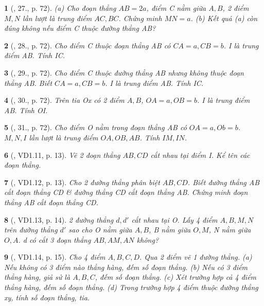 \documentclass{article}
\newtheorem{baitoan}{}
\begin{document}
\begin{baitoan}[\cite{Binh_Toan_6_tap_2}, 27., p. 72]
	(a) Cho đoạn thẳng $AB = 2a$, điểm C nằm giữa $A,B$, 2 điểm $M,N$ lần lượt là trung điểm $AC,BC$. Chứng minh $MN = a$. (b) Kết quả (a) còn đúng không nếu điểm C thuộc đường thẳng AB?
\end{baitoan}

\begin{baitoan}[\cite{Binh_Toan_6_tap_2}, 28., p. 72]
	Cho điểm C thuộc đoạn thẳng AB có $CA = a,CB = b$. I là trung điểm AB. Tính IC.
\end{baitoan}

\begin{baitoan}[\cite{Binh_Toan_6_tap_2}, 29., p. 72]
	Cho điểm C thuộc đường thẳng AB nhưng không thuộc đoạn thẳng AB. Biết $CA = a,CB = b$. I là trung điểm AB. Tính IC.
\end{baitoan}

\begin{baitoan}[\cite{Binh_Toan_6_tap_2}, 30., p. 72]
	Trên tia Ox có 2 điểm $A,B$, $OA = a,OB = b$. I là trung điểm AB. Tính OI.
\end{baitoan}

\begin{baitoan}[\cite{Binh_Toan_6_tap_2}, 31., p. 72]
	Cho điểm O nằm trong đoạn thẳng AB có $OA = a,Ob = b$. $M,N,I$ lần lượt là trung điểm $OA,OB,AB$. Tính $IM,IN$.
\end{baitoan}

\begin{baitoan}[\cite{TLCT_THCS_Toan_6_hinh_hoc}, VD1.11, p. 13]
	Vẽ 2 đoạn thẳng $AB,CD$ cắt nhau tại điểm I. Kể tên các đoạn thẳng.
\end{baitoan}

\begin{baitoan}[\cite{TLCT_THCS_Toan_6_hinh_hoc}, VD1.12, p. 13]
	Cho 2 đường thẳng phân biệt $AB,CD$. Biết đường thẳng AB cắt đoạn thẳng CD \& đường thẳng CD cắt đoạn thẳng AB. Chứng minh đoạn thẳng AB cắt đoạn thẳng CD.
\end{baitoan}

\begin{baitoan}[\cite{TLCT_THCS_Toan_6_hinh_hoc}, VD1.13, p. 14]
	2 đường thẳng $d,d'$ cắt nhau tại O. Lấy 4 điểm $A,B,M,N$ trên đường thẳng $d'$ sao cho O nằm giữa $A,B$, B nằm giữa $O,M$, N nằm giữa $O,A$. d có cắt 3 đoạn thẳng $AB,AM,AN$ không?
\end{baitoan}

\begin{baitoan}[\cite{TLCT_THCS_Toan_6_hinh_hoc}, VD1.14, p. 15]
	Cho 4 điểm $A,B,C,D$. Qua 2 điểm vẽ 1 đường thẳng. (a) Nếu không có 3 điểm nào thẳng hàng, đếm số đoạn thẳng. (b) Nếu có 3 điểm thẳng hàng, giả sử là $A,B,C$, đếm số đoạn thẳng. (c) Xét trường hợp cả 4 điểm thẳng hàng, đếm số đoạn thẳng. (d) Trong trường hợp 4 điểm thuộc đường thẳng xy, tính số đoạn thẳng, tia.
\end{baitoan}
\end{document}
